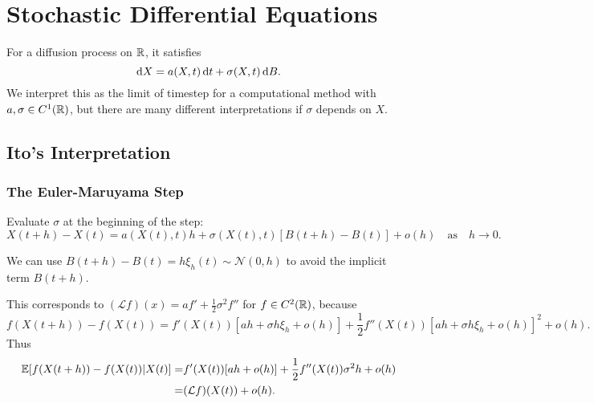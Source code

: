 \section{Stochastic Differential Equations}

\begin{example}
    For a diffusion process on $\mathbb{R}$, it satisfies
    \begin{equation*}
        \dif X = a(X, t) \dif t + \sigma (X, t) \dif B.
    \end{equation*}
    We interpret this as the limit of timestep for a computational method with $a, \sigma \in C^1(\mathbb{R})$, but there are many different interpretations if $\sigma$ depends on $X$.
\end{example}

\subsection{Ito's Interpretation}

\subsubsection{The Euler-Maruyama Step}

Evaluate $\sigma$ at the beginning of the step:
\begin{equation*}
    X(t + h) - X(t) = a(X(t), t) h + \sigma(X(t), t) [B(t+h) - B(t)] + o(h) \quad \text{as} \quad h \to 0.
\end{equation*}

\begin{remark}
    We can use $B(t+h) - B(t) = h \xi_h(t) \sim \mathcal{N}(0, h)$ to avoid the implicit term $B(t+h)$.
\end{remark}

\begin{remark}
    This corresponds to $(\mathcal{L}f)(x) = a f' + \frac{1}{2} \sigma^2 f''$ for $f \in C^2(\mathbb{R})$, because 
    \begin{equation*}
        f(X(t+h)) - f(X(t)) = f'(X(t)) [ah + \sigma h \xi_h + o(h)] + \frac{1}{2} f''(X(t)) [ah + \sigma h \xi_h +  o(h)]^2 + o(h).
    \end{equation*}
    Thus 
    \begin{align*}
        \mathbb{E} [f(X(t+h)) - f(X(t)) | X(t)] = & f'(X(t)) [ah  + o(h)] + \frac{1}{2} f''(X(t)) \sigma^2 h + o(h) \\ 
        = & (\mathcal{L}f)(X(t)) + o(h).
    \end{align*}
\end{remark}

